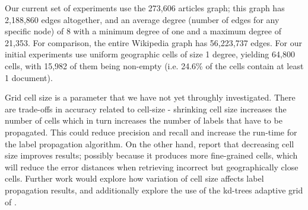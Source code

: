 \par %
Our current set of experiments use the 273,606 articles graph; this graph has
2,188,860 edges altogether, and an average degree (number of edges for any
specific node) of 8 with a minimum degree of one and a maximum degree of 21,353. For
comparison, the entire Wikipedia graph has 56,223,737 edges. For our initial
experiments use uniform geographic cells of size 1 degree, yielding 64,800
cells, with 15,982 of them being non-empty (i.e. 24.6\% of the cells contain
at  least 1 document).

\par Grid cell size is a parameter that we have not yet throughly
investigated. There are trade-offs in accuracy related to cell-size -
shrinking cell size increases the number of cells which in turn increases the
number of labels that have to be propagated. This could reduce precision and
recall and increase the run-time for the label propagation algorithm. On the
other hand,  report that decreasing cell size
improves results; possibly because it produces more fine-grained cells, which
will reduce the error distances when retrieving incorrect but geographically
close cells. Further work would explore how variation of cell size affects
label propagation results, and additionally explore the use of the kd-trees
adaptive grid of .

